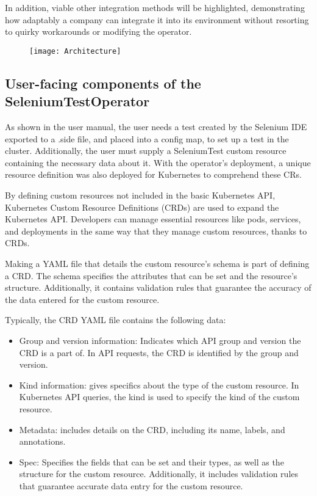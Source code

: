 In addition, viable other integration methods will be highlighted, demonstrating how adaptably a company can integrate it into its environment without resorting to quirky workarounds or modifying the operator.

\begin{figure}[H]
	\centering
	\texttt{[image: Architecture]}
	\label{fig:architecture}
\end{figure}

\subsection{User-facing components of the SeleniumTestOperator}
As shown in the user manual, the user needs a test created by the Selenium IDE exported to a .side file, and placed into a config map, to set up a test in the cluster. Additionally, the user must supply a SeleniumTest custom resource containing the necessary data about it. With the operator's deployment, a unique resource definition was also deployed for Kubernetes to comprehend these CRs.

By defining custom resources not included in the basic Kubernetes API, Kubernetes Custom Resource Definitions (CRDs) are used to expand the Kubernetes API. Developers can manage essential resources like pods, services, and deployments in the same way that they manage custom resources, thanks to CRDs.

Making a YAML file that details the custom resource's schema is part of defining a CRD. The schema specifies the attributes that can be set and the resource's structure. Additionally, it contains validation rules that guarantee the accuracy of the data entered for the custom resource.

Typically, the CRD YAML file contains the following data:

\begin{itemize}
	\item Group and version information: Indicates which API group and version the CRD is a part of. In API requests, the CRD is identified by the group and version.
	\item Kind information: gives specifics about the type of the custom resource. In Kubernetes API queries, the kind is used to specify the kind of the custom resource.
	\item Metadata: includes details on the CRD, including its name, labels, and annotations.
	\item Spec: Specifies the fields that can be set and their types, as well as the structure for the custom resource. Additionally, it includes validation rules that guarantee accurate data entry for the custom resource.
\end{itemize}

